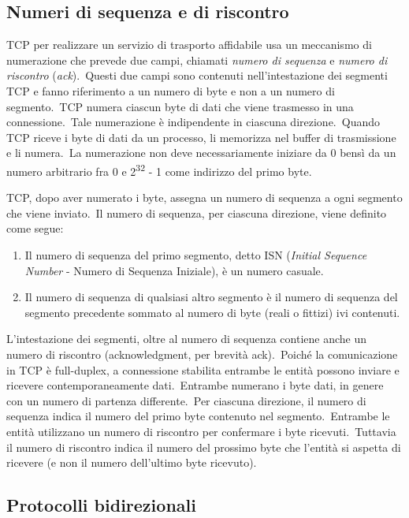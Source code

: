 \subsection{Numeri di sequenza e di riscontro}

TCP per realizzare un servizio di trasporto affidabile usa un meccanismo di numerazione che prevede due campi, chiamati \emph{numero di sequenza} e \emph{numero di riscontro} (\emph{ack}).\
Questi due campi sono contenuti nell'intestazione dei segmenti TCP e fanno riferimento a un numero di byte e non a un numero di segmento.\
TCP numera ciascun byte di dati che viene trasmesso in una connessione.\
Tale numerazione è indipendente in ciascuna direzione.\
Quando TCP riceve i byte di dati da un processo, li memorizza nel buffer di trasmissione e li numera.\
La numerazione non deve necessariamente iniziare da 0 bensì da un numero arbitrario fra 0 e 2\textsuperscript{32} - 1 come indirizzo del primo byte.

TCP, dopo aver numerato i byte, assegna un numero di sequenza a ogni segmento che viene inviato.\
Il numero di sequenza, per ciascuna direzione, viene definito come segue:

\begin{enumerate}
    \item Il numero di sequenza del primo segmento, detto ISN (\emph{Initial Sequence Number} - Numero di Sequenza Iniziale), è un numero casuale.
    \item Il numero di sequenza di qualsiasi altro segmento è il numero di sequenza del segmento precedente sommato al numero di byte (reali o fittizi) ivi contenuti.
\end{enumerate}

L'intestazione dei segmenti, oltre al numero di sequenza contiene anche un numero di riscontro (acknowledgment, per brevità ack).\
Poiché la comunicazione in TCP è full-duplex, a connessione stabilita entrambe le entità possono inviare e ricevere contemporaneamente dati.\
Entrambe numerano i byte dati, in genere con un numero di partenza differente.\
Per ciascuna direzione, il numero di sequenza indica il numero del primo byte contenuto nel segmento.\
Entrambe le entità utilizzano un numero di riscontro per confermare i byte ricevuti.\
Tuttavia il numero di riscontro indica il numero del prossimo byte che l'entità si aspetta di ricevere (e non il numero dell'ultimo byte ricevuto).

\subsection{Protocolli bidirezionali}

